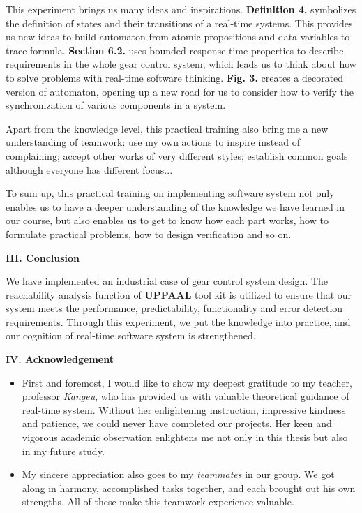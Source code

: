 \documentclass[a4paper]{article}
\begin{document}
\large{
This experiment brings us many ideas and inspirations. \textbf{Definition 4.} symbolizes the definition of states and their transitions of a real-time systems. This provides us new ideas to build automaton from atomic propositions and data variables to trace formula. \textbf{Section 6.2.} uses bounded response time properties to describe requirements in the whole gear control system, which leads us to think about how to solve problems with real-time software thinking. \textbf{Fig. 3.} creates a decorated version of automaton, opening up a new road for us to consider how to verify the synchronization of various components in a system. 

Apart from the knowledge level, this practical training also bring me a new understanding of teamwork: use my own actions to inspire instead of complaining; accept other works of very different styles; establish common goals although everyone has different focus...

To sum up, this practical training on implementing software system not only enables us to have a deeper understanding of the knowledge we have learned in our course, but also enables us to get to know how each part works, how to formulate practical problems, how to design verification and so on.}

\vspace{5mm}
\begin{center}
\LARGE\textbf{III. Conclusion} \\
\end{center}
\vspace{2mm}

\large{
We have implemented an industrial case of gear control system design. The reachability analysis function of \textbf{U\small{PPAAL}\large*} tool kit is utilized to ensure that our system meets the performance, predictability, functionality and error detection requirements. Through this experiment, we put the knowledge into practice, and our cognition of real-time software system is strengthened.}


\vspace{5mm}
\begin{center}
\LARGE\textbf{IV. Acknowledgement} \\
\end{center}
\vspace{.5mm}

\begin{itemize} \item{First and foremost, I would like to show my deepest gratitude to my teacher, professor \textit{Kangeu}, who has provided us with valuable theoretical guidance of real-time system. Without her enlightening instruction, impressive kindness and patience, we could never have completed our projects. Her keen and vigorous academic observation enlightens me not only in this thesis but also in my future study.}
\item{My sincere appreciation also goes to my \textit{teammates} in our group. We got along in harmony, accomplished tasks together, and each brought out his own strengths. All of these make this teamwork-experience valuable.}
\end{itemize}
\end{document}
